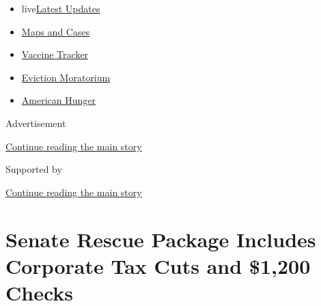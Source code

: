\begin{itemize}
\tightlist
\item
  live\href{https://www.nytimes3xbfgragh.onion/2020/09/09/world/covid-19-coronavirus.html?name=styln-coronavirus-national\&region=TOP_BANNER\&block=storyline_menu_recirc\&action=click\&pgtype=Article\&impression_id=2ff67c80-f280-11ea-bf3d-b99d4e75db11\&variant=undefined}{Latest
  Updates}
\item
  \href{https://www.nytimes3xbfgragh.onion/interactive/2020/us/coronavirus-us-cases.html?name=styln-coronavirus-national\&region=TOP_BANNER\&block=storyline_menu_recirc\&action=click\&pgtype=Article\&impression_id=2ff67c81-f280-11ea-bf3d-b99d4e75db11\&variant=undefined}{Maps
  and Cases}
\item
  \href{https://www.nytimes3xbfgragh.onion/interactive/2020/science/coronavirus-vaccine-tracker.html?name=styln-coronavirus-national\&region=TOP_BANNER\&block=storyline_menu_recirc\&action=click\&pgtype=Article\&impression_id=2ff67c82-f280-11ea-bf3d-b99d4e75db11\&variant=undefined}{Vaccine
  Tracker}
\item
  \href{https://www.nytimes3xbfgragh.onion/2020/09/02/your-money/eviction-moratorium-covid.html?name=styln-coronavirus-national\&region=TOP_BANNER\&block=storyline_menu_recirc\&action=click\&pgtype=Article\&impression_id=2ff67c83-f280-11ea-bf3d-b99d4e75db11\&variant=undefined}{Eviction
  Moratorium}
\item
  \href{https://www.nytimes3xbfgragh.onion/interactive/2020/09/02/magazine/food-insecurity-hunger-us.html?name=styln-coronavirus-national\&region=TOP_BANNER\&block=storyline_menu_recirc\&action=click\&pgtype=Article\&impression_id=2ff67c84-f280-11ea-bf3d-b99d4e75db11\&variant=undefined}{American
  Hunger}
\end{itemize}

Advertisement

\protect\hyperlink{after-top}{Continue reading the main story}

Supported by

\protect\hyperlink{after-sponsor}{Continue reading the main story}

\hypertarget{senate-rescue-package-includes-corporate-tax-cuts-and-1200-checks}{%
\section{Senate Rescue Package Includes Corporate Tax Cuts and \$1,200
Checks}\label{senate-rescue-package-includes-corporate-tax-cuts-and-1200-checks}}

